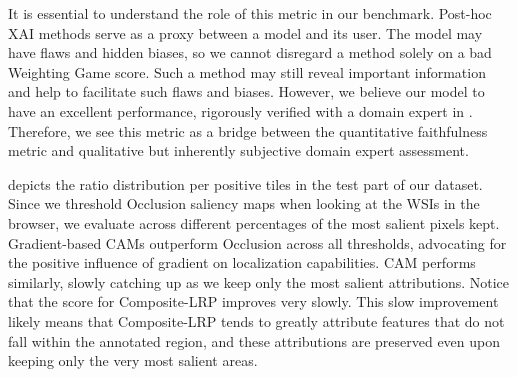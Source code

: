 It is essential to understand the role of this metric in our benchmark.
Post-hoc XAI methods serve as a proxy between a model and its user.
The model may have flaws and hidden biases, so we cannot disregard a method solely on a bad Weighting Game score.
Such a method may still reveal important information and help to facilitate such flaws and biases.
However, we believe our model to have an excellent performance, rigorously verified with a domain expert in \cite{gallo}.
Therefore, we see this metric as a bridge between the quantitative faithfulness metric and qualitative but inherently subjective domain expert assessment.

 depicts the ratio distribution per positive tiles in the test part of our dataset.
Since we threshold Occlusion saliency maps when looking at the WSIs in the browser, we evaluate across different percentages of the most salient pixels kept.
Gradient-based CAMs outperform Occlusion across all thresholds, advocating for the positive influence of gradient on localization capabilities.
CAM performs similarly, slowly catching up as we keep only the most salient attributions.
Notice that the score for Composite-LRP improves very slowly.
This slow improvement likely means that Composite-LRP tends to greatly attribute features that do not fall within the annotated region, and these attributions are preserved even upon keeping only the very most salient areas.


